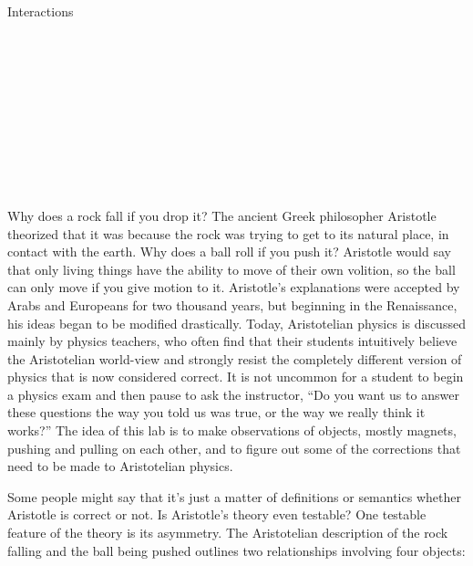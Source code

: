 \begin{lab}{Interactions}

\apparatus
{}\\
\\
\\
\\
\\
\\
\\
\\
\\


\labintroduction

Why does a rock fall if you drop it?  The ancient Greek
philosopher Aristotle theorized that it was because the rock
was trying to get to its natural place, in contact with the
earth.  Why does a ball roll if you push it? Aristotle would
say that only living things have the ability to move of
their own volition, so the ball can only move if you give
motion to it.  Aristotle's explanations were accepted by
Arabs and Europeans for two thousand years, but beginning in
the Renaissance, his ideas began to be modified drastically.
 Today, Aristotelian physics is discussed mainly by physics
teachers, who often find that their students intuitively
believe the Aristotelian world-view and strongly resist the
completely different version of physics that is now
considered correct.  It is not uncommon for a student to
begin a physics exam and then pause to ask the instructor,
``Do you want us to answer these questions the way you told
us was true, or the way we really think it works?''  The
idea of this lab is to make observations of objects, mostly
magnets, pushing and pulling on each other, and to figure
out some of the corrections that need to be made to
Aristotelian physics.

Some people might say that it's just a matter of definitions
or semantics whether Aristotle is correct or not.  Is
Aristotle's theory even testable?  One testable feature of
the theory is its asymmetry.  The Aristotelian description
of the rock falling and the ball being pushed outlines two
relationships involving four objects:



\end{lab}
